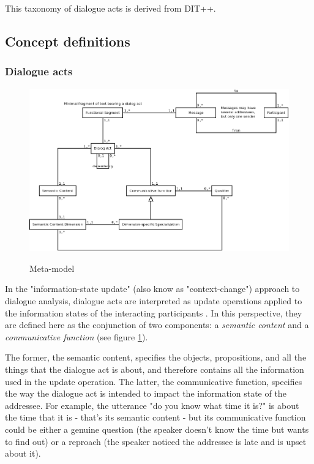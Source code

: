 This taxonomy of dialogue acts is derived from DIT++\cite{bunt2009dit++}.

\subsection{Concept definitions}
\label{subsec:dialogue_acts}

\subsubsection{Dialogue acts}

\begin{figure}[H]
	\caption{Meta-model}
	\centering
	\includegraphics[keepaspectratio,width=0.6\paperwidth]{figures/objects.png}
	\label{fig:metaModel}
\end{figure}

In the "information-state update" (also know as "context-change") approach to dialogue analysis, dialogue acts are interpreted as update operations applied to the information states of the interacting participants \cite{traum2003information,bunt2011semantics}. In this perspective, they are defined here as the conjunction of two components: a \textit{semantic content} and a \textit{communicative function} (see figure \ref{fig:metaModel}).

The former, the semantic content, specifies the objects, propositions, and all the things that the dialogue act is about, and therefore contains all the information used in the update operation. The latter, the communicative function, specifies the way the dialogue act is intended to impact the information state of the addressee. For example, the utterance "do you know what time it is?" is about the time that it is - that's its semantic content - but its communicative function could be either a genuine question (the speaker doesn't know the time but wants to find out) or a reproach (the speaker noticed the addressee is late and is upset about it).

